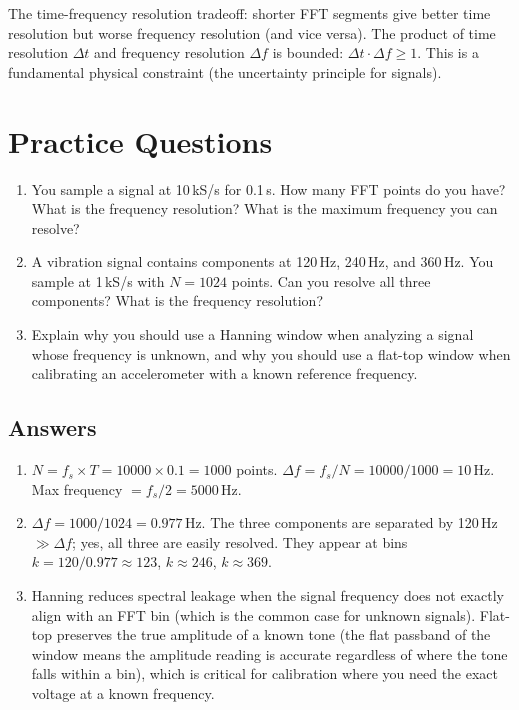 \documentclass[11pt,letterpaper,twoside,openany]{book}
\begin{document}
The time-frequency resolution tradeoff: shorter FFT segments give better time resolution but worse frequency resolution (and vice versa). The product of time resolution $\Delta t$ and frequency resolution $\Delta f$ is bounded: $\Delta t \cdot \Delta f \geq 1$. This is a fundamental physical constraint (the uncertainty principle for signals).
\section{Practice Questions}
\begin{enumerate}[leftmargin=1.5em]
\item You sample a signal at 10\,kS/s for 0.1\,s. How many FFT points do you have? What is the frequency resolution? What is the maximum frequency you can resolve?
\item A vibration signal contains components at 120\,Hz, 240\,Hz, and 360\,Hz. You sample at 1\,kS/s with $N = 1024$ points. Can you resolve all three components? What is the frequency resolution?
\item Explain why you should use a Hanning window when analyzing a signal whose frequency is unknown, and why you should use a flat-top window when calibrating an accelerometer with a known reference frequency.
\end{enumerate}

\subsection{Answers}
\begin{enumerate}[leftmargin=1.5em]
\item $N = f_s \times T = 10000 \times 0.1 = 1000$ points. $\Delta f = f_s/N = 10000/1000 = 10$\,Hz. Max frequency $= f_s/2 = 5000$\,Hz.
\item $\Delta f = 1000/1024 = 0.977$\,Hz. The three components are separated by 120\,Hz $\gg \Delta f$; yes, all three are easily resolved. They appear at bins $k = 120/0.977 \approx 123$, $k \approx 246$, $k \approx 369$.
\item Hanning reduces spectral leakage when the signal frequency does not exactly align with an FFT bin (which is the common case for unknown signals). Flat-top preserves the true amplitude of a known tone (the flat passband of the window means the amplitude reading is accurate regardless of where the tone falls within a bin), which is critical for calibration where you need the exact voltage at a known frequency.
\end{enumerate}
\end{document}
